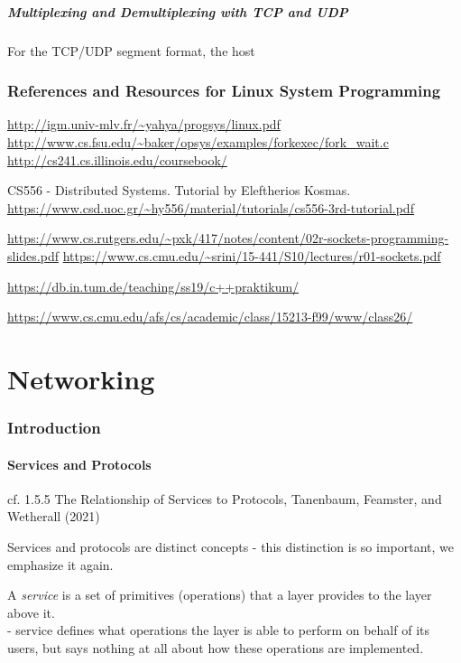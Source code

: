 \documentclass[10pt]{amsart}
\begin{document}
\begin{multicols*}{2}
\subsubsection{Multiplexing and Demultiplexing with TCP and UDP}

For the TCP/UDP segment format, the host


\section{References and Resources for Linux System Programming}

\url{http://igm.univ-mlv.fr/~yahya/progsys/linux.pdf} \\
\url{http://www.cs.fsu.edu/~baker/opsys/examples/forkexec/fork_wait.c} \\
\url{http://cs241.cs.illinois.edu/coursebook/}

CS556 - Distributed Systems. Tutorial by Eleftherios Kosmas.
\url{https://www.csd.uoc.gr/~hy556/material/tutorials/cs556-3rd-tutorial.pdf}


\url{https://www.cs.rutgers.edu/~pxk/417/notes/content/02r-sockets-programming-slides.pdf}
\url{https://www.cs.cmu.edu/~srini/15-441/S10/lectures/r01-sockets.pdf}

\url{https://db.in.tum.de/teaching/ss19/c++praktikum/}

\url{https://www.cs.cmu.edu/afs/cs/academic/class/15213-f99/www/class26/}

\part{Networking}

\section{Introduction}

\subsection{Services and Protocols}

cf. 1.5.5 The Relationship of Services to Protocols, Tanenbaum, Feamster, and Wetherall (2021) \cite{TFW2021}

Services and protocols are distinct concepts - this distinction is so important, we emphasize it again.

A \emph{service} is a set of primitives (operations) that a layer provides to the layer above it. \\
- service defines what operations the layer is able to perform on behalf of its users, but says nothing at all about how these operations are implemented. \\


\end{multicols*}
\end{document}
